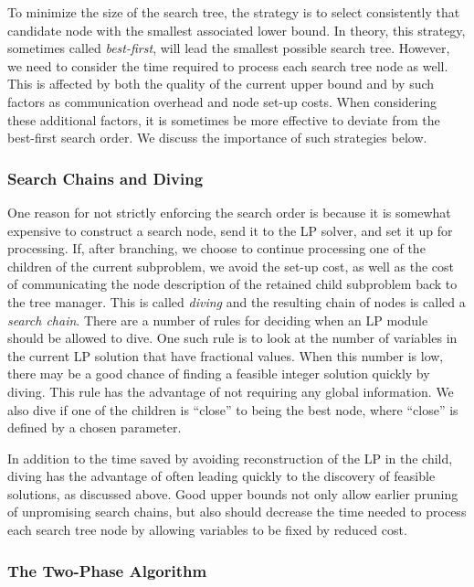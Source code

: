 To minimize the size of the search tree, the strategy is to select
consistently that candidate node with the smallest associated lower bound.
In theory, this strategy, sometimes called {\em best-first}, will lead
the smallest possible search tree. However, we need to consider the
time required to process each search tree node as well. This is affected
by both the quality of the current upper bound and by such factors as
communication overhead and node set-up costs. When considering these
additional factors, it is sometimes be more effective to deviate from the
best-first search order. We discuss the importance of such strategies
below.

\subsubsection{Search Chains and Diving}

One reason for not strictly enforcing the search order is because it
is somewhat expensive to construct a search node, send it to the LP
solver, and set it up for processing. If, after branching, we choose
to continue processing one of the children of the current subproblem,
we avoid the set-up cost, as well as the cost of communicating the
node description of the retained child subproblem back to the tree
manager. This is called {\em diving} and the resulting chain of nodes
is called a {\em search chain}. There are a number of rules for
deciding when an LP module should be allowed to dive. One such rule is
to look at the number of variables in the current LP solution that
have fractional values. When this number is low, there may be a good
chance of finding a feasible integer solution quickly by diving. This
rule has the advantage of not requiring any global information. We
also dive if one of the children is ``close'' to being the best node,
where ``close'' is defined by a chosen parameter.

In addition to the time saved by avoiding reconstruction of the LP in
the child, diving has the advantage of often leading quickly to the
discovery of feasible solutions, as discussed above. Good upper bounds
not only allow earlier pruning of unpromising search chains, but also
should decrease the time needed to process each search tree node by
allowing variables to be fixed by reduced cost.

\subsubsection{The Two-Phase Algorithm}
\label{two-phase}

